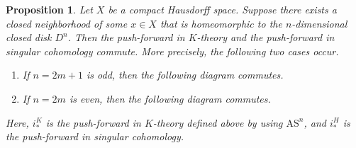 \documentclass{amsart}
\newtheorem{prop}[thm]{Proposition}
\theoremstyle{definition}
\theoremstyle{remark}
\begin{document}
\begin{prop}\label{prop:chern character and push forward}
Let $X$ be a compact Hausdorff space. Suppose there exists a closed neighborhood of some
$x \in X$ that is homeomorphic to the $n$-dimensional closed disk $D^n$.
Then the push-forward in $K$-theory and the push-forward in singular cohomology commute.
More precisely, the following two cases occur.

\begin{enumerate}
\item If $n=2m+1$ is odd, then the following diagram commutes.
\begin{center}
\end{center}

\item If $n=2m$ is even, then the following diagram commutes.
\begin{center}
\end{center}
\end{enumerate}

Here, $i_*^K$ is the push-forward in $K$-theory defined above by using $\mathrm{AS}^{n}$,
and $i_*^H$ is the push-forward in singular cohomology.
\end{prop}
\end{document}
